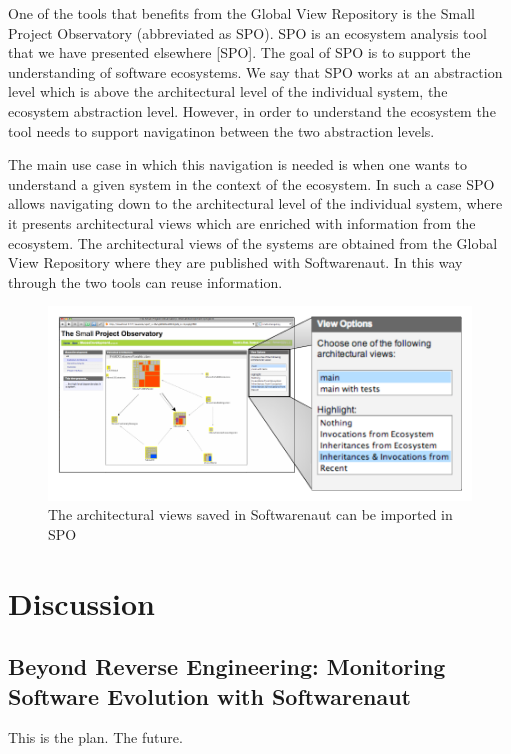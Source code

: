 \documentclass[preprint,12pt]{elsarticle}
\begin{document}
One of the tools that benefits from the Global View Repository is the Small Project Observatory (abbreviated as SPO). SPO is an ecosystem analysis tool that we have presented elsewhere [SPO]. The goal of SPO is to support the understanding of software ecosystems. We say that SPO works at an abstraction level which is above the architectural level of the individual system, the ecosystem abstraction level. However, in order to understand the  ecosystem the tool needs to support navigatinon between the two abstraction levels. 


The main use case in which this navigation is needed is when one wants to understand a given system in the context of the ecosystem. In such a case SPO allows navigating down to the architectural level of the individual system, where it presents architectural views which are enriched with information from the ecosystem. The architectural views of the systems are obtained from the Global View Repository where they are published with Softwarenaut. In this way through the two tools can reuse information.

\begin{figure}[th!]
\begin{center}
\includegraphics[width=\linewidth]{images/SpoArchitectural}
\caption{The architectural views saved in Softwarenaut can be imported in SPO}
\label{}
\end{center}
\end{figure}



\section {Discussion}
\label {sec:disc}
\subsection {Beyond Reverse Engineering: Monitoring Software Evolution with Softwarenaut}
This is the plan. The future. 
\end{document}

